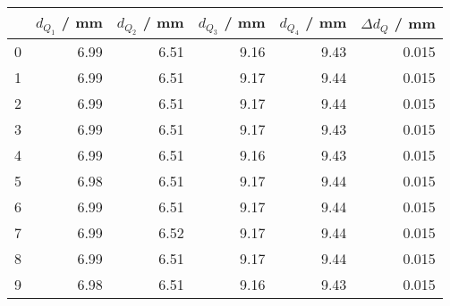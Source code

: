 \begin{tabular}{lrrrrr}
	\toprule
	{} & $d_{Q_1}$ / \si{\mm} & $d_{Q_2}$ / \si{\mm} & $d_{Q_3}$ / \si{\mm} & $d_{Q_4}$ / \si{\mm} & $\Delta d_{Q}$ / \si{\mm} \\
	\midrule
	0  & 6.99                 & 6.51                 & 9.16                 & 9.43                 & 0.015                     \\
	1  & 6.99                 & 6.51                 & 9.17                 & 9.44                 & 0.015                     \\
	2  & 6.99                 & 6.51                 & 9.17                 & 9.44                 & 0.015                     \\
	3  & 6.99                 & 6.51                 & 9.17                 & 9.43                 & 0.015                     \\
	4  & 6.99                 & 6.51                 & 9.16                 & 9.43                 & 0.015                     \\
	5  & 6.98                 & 6.51                 & 9.17                 & 9.44                 & 0.015                     \\
	6  & 6.99                 & 6.51                 & 9.17                 & 9.44                 & 0.015                     \\
	7  & 6.99                 & 6.52                 & 9.17                 & 9.44                 & 0.015                     \\
	8  & 6.99                 & 6.51                 & 9.17                 & 9.44                 & 0.015                     \\
	9  & 6.98                 & 6.51                 & 9.16                 & 9.43                 & 0.015                     \\
	\bottomrule
\end{tabular}

